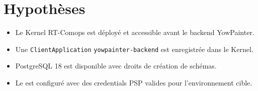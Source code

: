 \section{Hypothèses}

\begin{itemize}[noitemsep]
  \item Le Kernel RT-Comops est déployé et accessible avant le backend YowPainter.
  \item Une \texttt{ClientApplication} \texttt{yowpainter-backend} est enregistrée dans le Kernel.
  \item PostgreSQL 18 est disponible avec droits de création de schémas.
  \item Le  est configuré avec des credentials PSP valides pour l'environnement cible.
\end{itemize}
